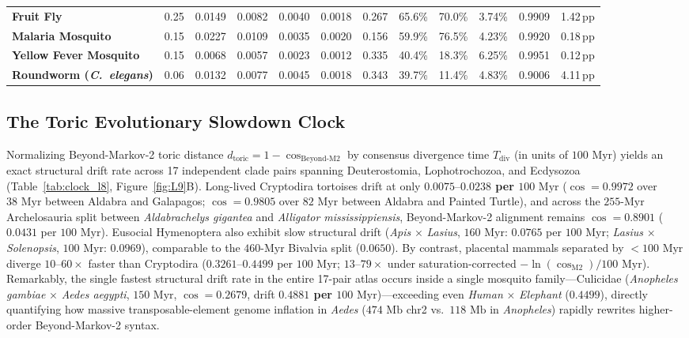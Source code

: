 \documentclass[11pt,a4paper]{article}
\renewcommand{\_}{\origunderscore\penalty200\relax}
\theoremstyle{remark}
\begin{document}
\begin{table}[H]
{{\begin{tabular}{lrrrrrrrrrrr}
\textbf{Fruit Fly} & 0.25 & 0.0149 & 0.0082 & 0.0040 & 0.0018 & 0.267 & 65.6\% & 70.0\% & 3.74\% & 0.9909 & 1.42\,pp \\
\textbf{Malaria Mosquito} & 0.15 & 0.0227 & 0.0109 & 0.0035 & 0.0020 & 0.156 & 59.9\% & 76.5\% & 4.23\% & 0.9920 & 0.18\,pp \\
\textbf{Yellow Fever Mosquito} & 0.15 & 0.0068 & 0.0057 & 0.0023 & 0.0012 & 0.335 & 40.4\% & 18.3\% & 6.25\% & 0.9951 & 0.12\,pp \\
\textbf{Roundworm (\textit{C.\ elegans})} & 0.06 & 0.0132 & 0.0077 & 0.0045 & 0.0018 & 0.343 & 39.7\% & 11.4\% & 4.83\% & 0.9006 & 4.11\,pp \\
\bottomrule
\end{tabular}}}
\end{table}

\subsection{The Toric Evolutionary Slowdown Clock}
Normalizing Beyond-Markov-2 toric distance $d_{\mathrm{toric}} = 1 - \cos_{\mathrm{Beyond\text{-}M2}}$ by consensus divergence time $T_{\mathrm{div}}$ (in units of $100\text{ Myr}$) yields an exact structural drift rate across 17 independent clade pairs spanning Deuterostomia, Lophotrochozoa, and Ecdysozoa (Table~\ref{tab:clock_l8}, Figure~\ref{fig:L9}B).
Long-lived Cryptodira tortoises drift at only \textbf{$0.0075\text{--}0.0238$ per $100\text{ Myr}$} ($\cos = 0.9972$ over $38\text{ Myr}$ between Aldabra and Galapagos; $\cos = 0.9805$ over $82\text{ Myr}$ between Aldabra and Painted Turtle), and across the $255\text{-Myr}$ Archelosauria split between \textit{Aldabrachelys gigantea} and \textit{Alligator mississippiensis}, Beyond-Markov-2 alignment remains $\cos = 0.8901$ ($0.0431$ per $100\text{ Myr}$).
Eusocial Hymenoptera also exhibit slow structural drift (\textit{Apis} $\times$ \textit{Lasius}, $160\text{ Myr}$: $0.0765$ per $100\text{ Myr}$; \textit{Lasius} $\times$ \textit{Solenopsis}, $100\text{ Myr}$: $0.0969$), comparable to the $460\text{-Myr}$ Bivalvia split ($0.0650$).
By contrast, placental mammals separated by $<100\text{ Myr}$ diverge $10\text{--}60\times$ faster than Cryptodira ($0.3261\text{--}0.4499$ per $100\text{ Myr}$; $13\text{--}79\times$ under saturation-corrected $-\ln(\cos_{\mathrm{M2}})/100\text{ Myr}$).
Remarkably, the single fastest structural drift rate in the entire 17-pair atlas occurs inside a single mosquito family---Culicidae (\textit{Anopheles gambiae} $\times$ \textit{Aedes aegypti}, $150\text{ Myr}$, $\cos = 0.2679$, drift \textbf{$0.4881$ per $100\text{ Myr}$})---exceeding even \textit{Human} $\times$ \textit{Elephant} ($0.4499$), directly quantifying how massive transposable-element genome inflation in \textit{Aedes} ($474\text{ Mb}$ chr2 vs.\ $118\text{ Mb}$ in \textit{Anopheles}) rapidly rewrites higher-order Beyond-Markov-2 syntax.
\end{document}
